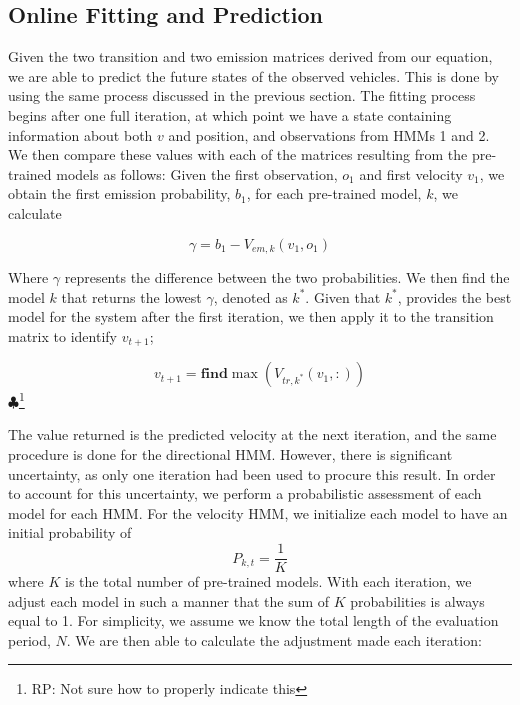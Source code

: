 \documentclass[conference]{IEEEtran}
\newcommand\RP[1]{$\clubsuit$\footnote{RP: #1}}
\begin{document}
\subsection{Online Fitting and Prediction}
Given the two transition and two emission matrices derived from our equation, we are able to predict the future states of the observed vehicles. This is done by using the same process discussed in the previous section. The fitting process begins after one full iteration, at which point we have a state containing information about both $v$ and position, and observations from HMMs 1 and 2. We then compare these values with each of the matrices resulting from the pre-trained models as follows: Given the first observation, $o_{1}$ and first velocity $v_{1}$, we obtain the first emission probability, $b_{1}$, for each pre-trained model, $k$, we calculate

\begin{equation} \label{probdist}
   \gamma =  b_{1} - V_{em,k}(v_{1},o_{1})
\end{equation}

Where $\gamma$ represents the difference between the two probabilities. We then find the model $k$ that returns the lowest $\gamma$, denoted as $k^{*}$. Given that $k^{*}$, provides the best model for the system after the first iteration, we then apply it to the transition matrix to identify $v_{t+1}$;

\begin{equation} \label{findmaxvalue}
    v_{t+1} = \mathbf{find}\max(V_{tr,k^{*}}(v_{1},:))
\end{equation}   \RP{Not sure how to properly indicate this}

The value returned is the predicted velocity at the next iteration, and the same procedure is done for the directional HMM. However, there is significant uncertainty, as only one iteration had been used to procure this result. In order to account for this uncertainty, we perform a probabilistic assessment of each model for each HMM. For the velocity HMM, we initialize each model to have an initial probability of 
\begin{equation} \label{initprob}
    P_{k,t} = \frac{1}{K}    
\end{equation}
where $K$ is the total number of pre-trained models. With each iteration, we adjust each model in such a manner that the sum of $K$ probabilities is always equal to 1. For simplicity, we assume we know the total length of the evaluation period, $N$. We are then able to calculate the adjustment made each iteration:
\end{document}
